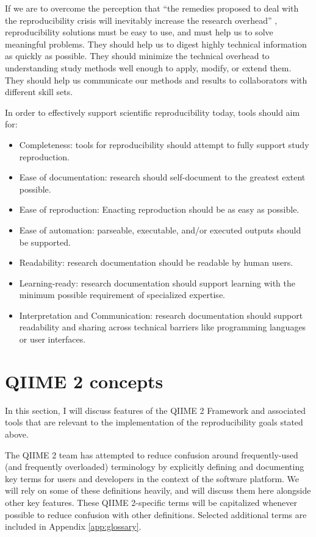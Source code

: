 If we are to overcome the perception that “the remedies proposed to deal with
the reproducibility crisis will inevitably increase the research overhead” \parencite[2634]{shiffrin_scientific_2018},
reproducibility solutions must be easy to use, and must help us to solve
meaningful problems. They should help us to digest highly technical information
as quickly as possible. They should minimize the technical overhead to
understanding study methods well enough to apply, modify, or extend them. They
should help us communicate our methods and results to collaborators with
different skill sets.

In order to effectively support scientific reproducibility today, tools should
aim for:
\begin{itemize}
    \item Completeness: tools for reproducibility should attempt to fully support study reproduction.
    \item Ease of documentation: research should self-document to the greatest extent possible.
    \item Ease of reproduction: Enacting reproduction should be as easy as possible.
    \item Ease of automation: parseable, executable, and/or executed outputs should be supported.
    \item Readability: research documentation should be readable by human users.
    \item Learning-ready: research documentation should support learning with
        the minimum possible requirement of specialized expertise.
    \item Interpretation and Communication: research documentation should
        support readability and sharing across technical barriers like programming
        languages or user interfaces.
\end{itemize}


\section{QIIME 2 concepts}

In this section, I will discuss features of the QIIME 2 Framework and associated
tools that are relevant to the implementation of the reproducibility goals
stated above. 

The QIIME 2 team has attempted to reduce confusion around frequently-used (and
frequently overloaded) terminology by explicitly defining and documenting key
terms for users \parencite{qiime_2_development_team_glossary_2016} and
developers \parencite{qiime_2_development_team_glossary_2018} in the context of
the software platform.  We will rely on some of these definitions heavily, and
will discuss them here alongside other key features. These QIIME 2-specific
terms will be capitalized whenever possible to reduce confusion with other
definitions. Selected additional terms are included in Appendix \ref{app:glossary}.

